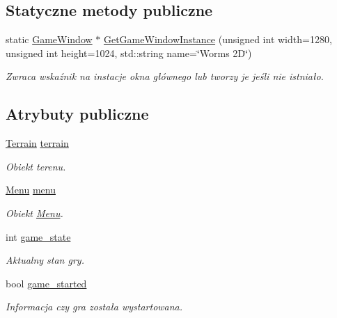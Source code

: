 \subsection*{Statyczne metody publiczne}
\begin{DoxyCompactItemize}
\item 
static \mbox{\hyperlink{class_game_window}{Game\+Window}} $\ast$ \mbox{\hyperlink{class_game_window_a9c480a3795bfd6d22a9dc8a3bae47b1b}{Get\+Game\+Window\+Instance}} (unsigned int width=1280, unsigned int height=1024, std\+::string name=\char`\"{}Worms 2\+D\char`\"{})
\begin{DoxyCompactList}\small\item\em Zwraca wskaźnik na instacje okna głównego lub tworzy je jeśli nie istniało. \end{DoxyCompactList}\end{DoxyCompactItemize}
\subsection*{Atrybuty publiczne}
\begin{DoxyCompactItemize}
\item 
\mbox{\hyperlink{class_terrain}{Terrain}} \mbox{\hyperlink{class_game_window_ab5d02e9738d1f7f3fea4cd146172cf11}{terrain}}
\begin{DoxyCompactList}\small\item\em Obiekt terenu. \end{DoxyCompactList}\item 
\mbox{\hyperlink{class_menu}{Menu}} \mbox{\hyperlink{class_game_window_a3c63dc36f53ecb9b1d055923293daffd}{menu}}
\begin{DoxyCompactList}\small\item\em Obiekt \mbox{\hyperlink{class_menu}{Menu}}. \end{DoxyCompactList}\item 
int \mbox{\hyperlink{class_game_window_aafe2b1768f704b81e4fe94115287b9f7}{game\+\_\+state}}
\begin{DoxyCompactList}\small\item\em Aktualny stan gry. \end{DoxyCompactList}\item 
bool \mbox{\hyperlink{class_game_window_a5ce0d59c491a490bc1d98afcac741016}{game\+\_\+started}}
\begin{DoxyCompactList}\small\item\em Informacja czy gra została wystartowana. \end{DoxyCompactList}\end{DoxyCompactItemize}


